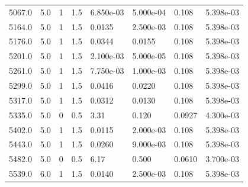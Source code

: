 \documentclass[preview]{standalone}
\begin{document}
{{{\begin{tabular}{L{1.2cm}C{1.2cm} C{0.3cm}C{0.5cm} C{1.4cm}C{1.4cm} C{1.4cm}C{1.4cm}}
  5067.0  &   5.0  & 1     & 1.5 &  6.850e-03  & 5.000e-04  & 0.108 &  5.398e-03   \\ 
  5164.0  &   5.0  & 1     & 1.5 &  0.0135  & 2.500e-03  & 0.108 &  5.398e-03   \\ 
  5176.0  &   5.0  & 1     & 1.5 &  0.0344  & 0.0155  & 0.108 &  5.398e-03   \\ 
  5201.0  &   5.0  & 1     & 1.5 &  2.100e-03  & 5.000e-05  & 0.108 &  5.398e-03   \\ 
  5261.0  &   5.0  & 1     & 1.5 &  7.750e-03  & 1.000e-03  & 0.108 &  5.398e-03   \\ 
  5299.0  &   5.0  & 1     & 1.5 &  0.0416  & 0.0220  & 0.108 &  5.398e-03   \\ 
  5317.0  &   5.0  & 1     & 1.5 &  0.0312  & 0.0130  & 0.108 &  5.398e-03   \\ 
  5335.0  &   5.0  & 0     & 0.5 &  3.31  & 0.120  & 0.0927 &  4.300e-03   \\ 
  5402.0  &   5.0  & 1     & 1.5 &  0.0115  & 2.000e-03  & 0.108 &  5.398e-03   \\ 
  5443.0  &   5.0  & 1     & 1.5 &  0.0260  & 9.000e-03  & 0.108 &  5.398e-03   \\ 
  5482.0  &   5.0  & 0     & 0.5 &  6.17  & 0.500  & 0.0610 &  3.700e-03   \\ 
  5539.0  &   6.0  & 1     & 1.5 &  0.0140  & 2.500e-03  & 0.108 &  5.398e-03   \\ 
\hline 
\end{tabular} 

}}}
\end{document}
